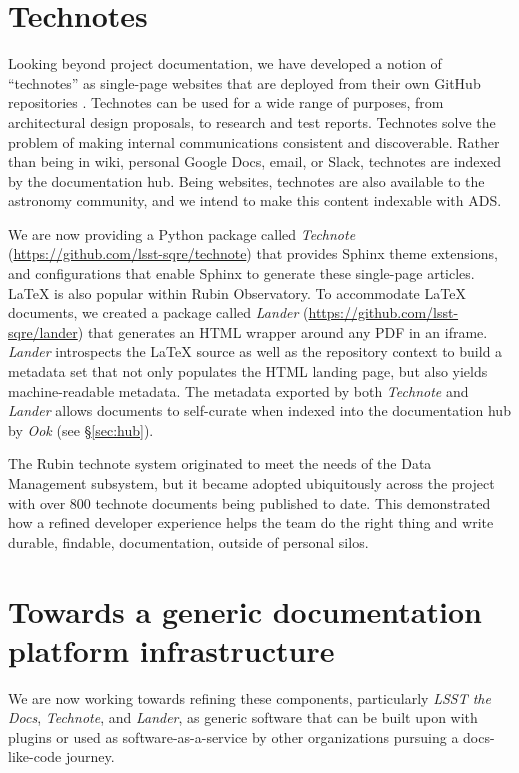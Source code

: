 \documentclass[11pt,twoside]{article}
\begin{document}

\label{sec:technotes}
\section{Technotes}

Looking beyond project documentation, we have developed a notion of ``technotes'' as single-page websites that are deployed from their own GitHub repositories \citep{SQR-000}.
Technotes can be used for a wide range of purposes, from architectural design proposals, to research and test reports.
Technotes solve the problem of making internal communications consistent and discoverable.
Rather than being in wiki, personal Google Docs, email, or Slack, technotes are indexed by the documentation hub.
Being websites, technotes are also available to the astronomy community, and we intend to make this content indexable with ADS.

We are now providing a Python package called \textit{Technote} (\url{https://github.com/lsst-sqre/technote}) that provides Sphinx theme extensions, and configurations that enable Sphinx to generate these single-page articles.
LaTeX is also popular within Rubin Observatory.
To accommodate LaTeX documents, we created a package called \textit{Lander} (\url{https://github.com/lsst-sqre/lander}) that generates an HTML wrapper around any PDF in an iframe.
\textit{Lander} introspects the LaTeX source as well as the repository context to build a metadata set that not only populates the HTML landing page, but also yields machine-readable metadata.
The metadata exported by both \textit{Technote} and \textit{Lander} allows documents to self-curate when indexed into the documentation hub by \textit{Ook} (see \S\ref{sec:hub}).

The Rubin technote system originated to meet the needs of the Data Management subsystem, but it became adopted ubiquitously across the project with over 800 technote documents being published to date.
This demonstrated how a refined developer experience helps the team do the right thing and write durable, findable, documentation, outside of personal silos.

\section{Towards a generic documentation platform infrastructure}

We are now working towards refining these components, particularly \textit{LSST the Docs}, \textit{Technote}, and \textit{Lander}, as generic software that can be built upon with plugins or used as software-as-a-service by other organizations pursuing a docs-like-code journey.
\end{document}
